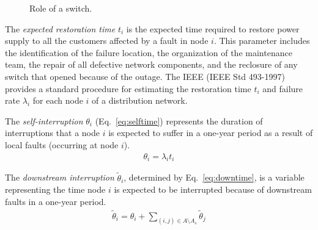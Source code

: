 \begin{figure}[hbtp]
\begin{center}
	\end{center}
	\vspace{-0.5cm}
\caption{Role of a switch.}
\label{fig:example}
\end{figure}

The \textit{expected restoration time} $t_i$ is the expected time required to restore power supply to all the customers affected by a fault in node $i$.
This parameter includes the identification of the failure location, the organization of the maintenance team, the repair of all defective network components, and the reclosure of any switch that opened because of the outage. The IEEE \cite{goldbook} (IEEE Std 493-1997) provides a standard procedure for estimating the restoration time $t_i$ and failure rate $\lambda_i$ for each node $i$ of a distribution network.

The \textit{self-interruption} $\theta_i$ (Eq.~\ref{eq:selftime}) represents the duration of  interruptions that a node $i$ is expected to suffer in a one-year period as a result of local faults (occurring at node $i$). 
	\begin{align} 
		\displaystyle \theta_{i} = \lambda_i t_i \label{eq:selftime} 
	\end{align}


The \textit{downstream interruption} $\tilde{\theta}_{i}$, determined by Eq.~\eqref{eq:downtime},  is a variable representing the time node $i$ is expected to be interrupted because of downstream faults in a one-year period.
	\begin{align}
		\displaystyle \tilde{\theta}_{i} = \theta_{i} + \sum_{(i,j) \in A \setminus A_{s}}{\tilde{\theta}_{j}} \label{eq:downtime}
	\end{align}


